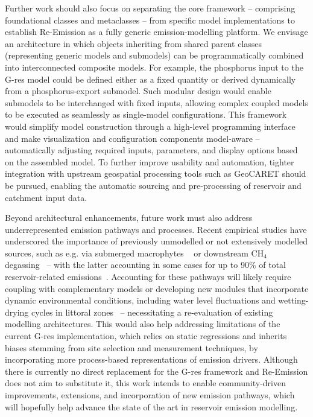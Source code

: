 \documentclass[review, authoryear, 1p]{elsarticle} %
\begin{document}
Further work should also focus on separating the core framework -- comprising foundational classes and metaclasses -- from specific model implementations to establish Re-Emission as a fully generic emission-modelling platform.
We envisage an architecture in which objects inheriting from shared parent classes (representing generic models and submodels) can be programmatically combined into interconnected composite models.
For example, the phosphorus input to the G-res model could be defined either as a fixed quantity or derived dynamically from a phosphorus-export submodel.
Such modular design would enable submodels to be interchanged with fixed inputs, allowing complex coupled models to be executed as seamlessly as single-model configurations.
This framework would simplify model construction through a high-level programming interface and make visualization and configuration components model-aware -- automatically adjusting required inputs, parameters, and display options based on the assembled model.
To further improve usability and automation, tighter integration with upstream geospatial processing tools such as GeoCARET should be pursued, enabling the automatic sourcing and pre-processing of reservoir and catchment input data.

Beyond architectural enhancements, future work must also address underrepresented emission pathways and processes.
Recent empirical studies have underscored the importance of previously unmodelled or not extensively modelled sources, such as e.g. via submerged macrophytes ~\citep{Hilt2022, Suraj2023} or downstream CH$_4$ degassing~\citep{Abbasi2020, Zhou2024} -- with the latter accounting in some cases for up to 90\% of total reservoir-related emissions~\citep{Deshmukh}.
Accounting for these pathways will likely require coupling with complementary models or developing new modules that incorporate dynamic environmental conditions, including water level fluctuations and wetting-drying cycles in littoral zones~\cite{Calamita2021, Ion2021} -- necessitating a re-evaluation of existing modelling architectures.
This would also help addressing limitations of the current G-res implementation, which relies on static regressions and inherits biases stemming from site selection and measurement techniques, by incorporating more process-based representations of emission drivers.
Although there is currently no direct replacement for the G-res framework and Re-Emission does not aim to substitute it, this work intends to enable community-driven improvements, extensions, and incorporation of new emission pathways, which will hopefully help advance the state of the art in reservoir emission modelling.
\end{document}
